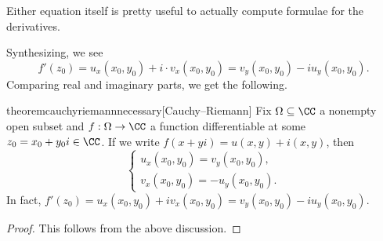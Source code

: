 \begin{remark}
	Either equation itself is pretty useful to actually compute formulae for the derivatives.
\end{remark}
Synthesizing, we see
\[f'(z_0)=u_x(x_0,y_0)+i\cdot v_x(x_0,y_0)=v_y(x_0,y_0)-iu_y(x_0,y_0).\]
Comparing real and imaginary parts, we get the following.
\begin{restatable}{theorem}{cauchyriemannnecessary}[Cauchy--Riemann] \label{thm:crnecessary}
	Fix $\Omega\subseteq\CC$ a nonempty open subset and $f:\Omega\to\CC$ a function differentiable at some $z_0=x_0+y_0i\in\CC$. If we write $f(x+yi)=u(x,y)+i(x,y)$, then
	\[\begin{cases}
		u_x(x_0,y_0)=v_y(x_0,y_0), \\
		v_x(x_0,y_0)=-u_y(x_0,y_0).
	\end{cases}\]
	In fact, $f'(z_0)=u_x(x_0,y_0)+iv_x(x_0,y_0)=v_y(x_0,y_0)-iu_y(x_0,y_0)$.
\end{restatable}
\begin{proof}
	This follows from the above discussion.
\end{proof}

